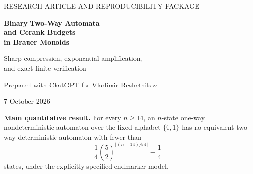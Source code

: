 \documentclass[11pt,letterpaper]{article}
\theoremstyle{definition}
\newcommand{\bits}{\{0,1\}}
\begin{document}
\hypersetup{pageanchor=false}
\begin{titlepage}
\centering
\vspace*{0.7cm}
{\Large\color{accent} RESEARCH ARTICLE AND REPRODUCIBILITY PACKAGE\par}
\vspace{1.1cm}
{\huge\bfseries\color{ink} Binary Two-Way Automata\\[5pt]
and Corank Budgets\\[5pt] in Brauer Monoids\par}
\vspace{0.65cm}
{\large Sharp compression, exponential amplification,\\
and exact finite verification\par}
\vspace{0.85cm}
{\large Prepared with ChatGPT for Vladimir Reshetnikov\par}
\vspace{0.2cm}
{\large 7 October 2026\par}
\vspace{1cm}
\begin{minipage}{0.9\textwidth}
\textbf{Main quantitative result.}
For every $n\ge14$, an $n$-state one-way nondeterministic automaton
over the fixed alphabet $\bits$ has no equivalent two-way
deterministic automaton with fewer than
\[
 \frac14\left(\frac52\right)^{\lfloor(n-14)/54\rfloor}-\frac14
\]
states, under the explicitly specified endmarker model.
\end{minipage}
\vspace{0.7cm}
\begin{abstract}
We develop and sharpen the matching-monoid method in the September
2026 OpenAI manuscript on one-way liveness, in the context of recent
automata reports in ProveIt. The central algebraic observation is a
sharp, repetition-independent budget: the corank of any word in
finitely many Brauer idempotents is at most the sum of their individual
coranks. A short proof follows from the classical colored-component
description of idempotents. This budget controls both nested corners
in a relation-addition amplifier, giving the degree lower bound
$2(5/2)^{\lfloor(h-2)/9\rfloor}$ for a Brauer monoid having the full
relation monoid on $h$ points as a divisor.

On the automata side, we construct a symbol-local matching representation
of a binary $s$-state deterministic two-way automaton in degree at most
$8s+2$. A four-letter compiler on $2h$ relation states, followed by
two-bit decoding, gives a completely defined binary one-way
nondeterministic language with $6h+2$ states and the required relation
divisor. Together these yield an explicit exponential binary
determinization lower bound with coefficient
$\log_2(5/2)/54$ in the exponent. We also prove a sharp support bound
with equality, enumeration, and stability, and give an optimized
finite recurrence. A separate binary complementation consequence is
stated with its external theorem dependency identified.


\end{abstract}
\end{titlepage}
\end{document}
